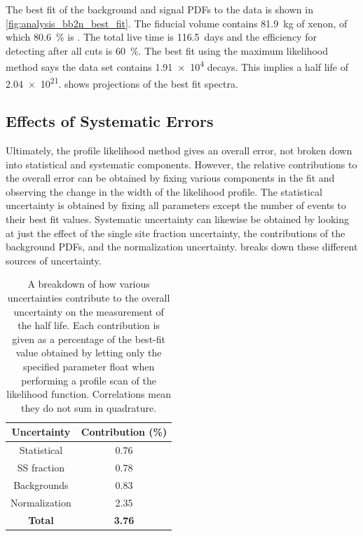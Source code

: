 \documentclass[herrin-thesis.tex]{subfiles}
\begin{document}
The best fit of the background and signal PDFs to the data is shown in \cref{fig:analysis_bb2n_best_fit}. The fiducial volume contains \SI{81.9}{\kg} of xenon, of which \SI{80.6}{\percent} is . The total live time is \SI{116.5}{days} and the efficiency for detecting \twonu{} after all cuts is \SI{60}{\percent}. The best fit using the maximum likelihood method says the data set contains \num{1.91e4} \twonu{} decays. This implies a half life of \SI{2.04e21}{\year}.  shows projections of the best fit spectra.

\subsection{Effects of Systematic Errors}
Ultimately, the profile likelihood method gives an overall error, not broken down into statistical and systematic components. However, the relative contributions to the overall error can be obtained by fixing various components in the fit and observing the change in the width of the likelihood profile. The statistical uncertainty is obtained by fixing all parameters except the number of \twonu{} events to their best fit values. Systematic uncertainty can likewise be obtained by looking at just the effect of the single site fraction uncertainty, the contributions of the background PDFs, and the normalization uncertainty.  breaks down these different sources of uncertainty.

\begin{table}[htbp]
\centering
\caption[Effect of uncertainties on the half life measurement]{A breakdown of how various uncertainties contribute to the overall uncertainty on the measurement of the \twonu{} half life. Each contribution is given as a percentage of the best-fit value obtained by letting only the specified parameter float when performing a profile scan of the likelihood function. Correlations mean they do not sum in quadrature.}
\label{tab:analysis_error_budget}
\begin{tabular}{c c}\toprule
Uncertainty	&	Contribution (\%)	\\\midrule
Statistical		&	0.76				\\
SS fraction	&	0.78				\\
Backgrounds	&	0.83				\\
Normalization	&	2.35				\\\midrule
\textbf{Total}	&	\textbf{3.76}		\\\bottomrule
\end{tabular}
\end{table}
\end{document}
